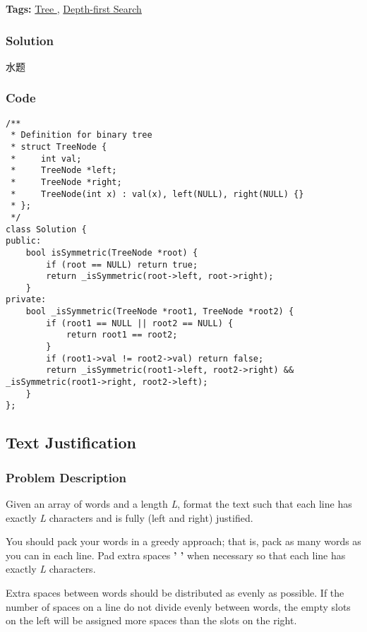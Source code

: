 \documentclass{article}
\begin{document}
\begin{CJK*}{UTF8}{gkai}
\textbf{Tags: }
\hyperref[ Tree ]{ Tree },  \hyperref[ Depth-first Search ]{ Depth-first Search }



\subsubsection*{Solution}
水题

\subsubsection*{Code}
\begin{lstlisting}
/**
 * Definition for binary tree
 * struct TreeNode {
 *     int val;
 *     TreeNode *left;
 *     TreeNode *right;
 *     TreeNode(int x) : val(x), left(NULL), right(NULL) {}
 * };
 */
class Solution {
public:
    bool isSymmetric(TreeNode *root) {
        if (root == NULL) return true;
        return _isSymmetric(root->left, root->right);
    }
private:
    bool _isSymmetric(TreeNode *root1, TreeNode *root2) {
        if (root1 == NULL || root2 == NULL) {
            return root1 == root2;
        }
        if (root1->val != root2->val) return false;
        return _isSymmetric(root1->left, root2->right) && _isSymmetric(root1->right, root2->left);
    }
}; 
\end{lstlisting}


\subsection{ Text Justification }
\label{ Text Justification }

\subsubsection*{Problem Description}
Given an array of words and a length \emph{L}, format the text such that each line has exactly \emph{L} characters and is fully (left and right) justified.

You should pack your words in a greedy approach; that is, pack as many words as you can in each line. Pad extra spaces \textbf{' '} when necessary so that each line has exactly \emph{L} characters.

Extra spaces between words should be distributed as evenly as possible. If the number of spaces on a line do not divide evenly between words, the empty slots on the left will be assigned more spaces than the slots on the right.


\end{CJK*}
\end{document}

